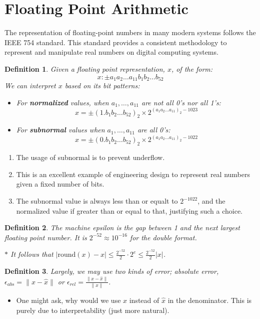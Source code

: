 \documentclass[11pt,reqno]{amsart}
\newtheorem{definition}{Definition}
\theoremstyle{remark}
\begin{document}
\section{Floating Point Arithmetic}

The representation of floating-point numbers in many modern systems follows the IEEE 754 standard. This standard provides a consistent methodology to represent and manipulate real numbers on digital computing systems.

\begin{definition}
Given a floating point representation, \( x \), of the form:
\[ x: \pm a_1a_2 \dots a_{11}b_1b_2 \dots b_{52} \]
We can interpret \( x \) based on its bit patterns:
\begin{itemize}
    \item For \textbf{normalized} values, when \( a_1, \dots, a_{11} \) are not all 0's nor all 1's:
    \[ x = \pm (1.b_1b_2 \dots b_{52})_2 \times 2^{(a_1a_2 \dots a_{11})_2 - 1023} \]
    
    \item For \textbf{subnormal} values when \( a_1, \dots, a_{11} \) are all 0's:
    \[ x = \pm (0.b_1b_2 \dots b_{52})_2 \times 2^{(a_1a_2 \dots a_{11})_2 - 1022} \]
\end{itemize}
\end{definition}
\begin{enumerate}
\item The usage of subnormal is to prevent underflow.
\item This is an excellent example of engineering design to represent real numbers given a fixed number of bits.
\item The subnormal value is always less than or equalt to $2^{-1022}$, and the normalized value if greater than or equal to that, justifying such a choice.
\end{enumerate}
\begin{definition}
The machine epsilon is the gap between 1 and the next largest floating point number. It is $2^{-52}\approx 10^{-16}$ for the double format.

$\ast$ It follows that $\lvert \text{round}(x)-x\rvert\leq\frac{2^{-52}}2\cdot 2^e\leq \frac{2^{-52}}2\lvert x\rvert$.
\end{definition}
\begin{definition}
Largely, we may use two kinds of error; absolute error, $\epsilon_{abs}=\lVert x-\hat x\rVert$ or $\epsilon_{rel} = \frac{\lVert x-\hat x\rVert}{\lVert x\rVert}$.
\end{definition}
\begin{itemize}
\item One might ask, why would we use $x$ instead of $\hat x$ in the denominator. This is purely due to interpretability (just more natural).
\end{itemize}
\end{document}
